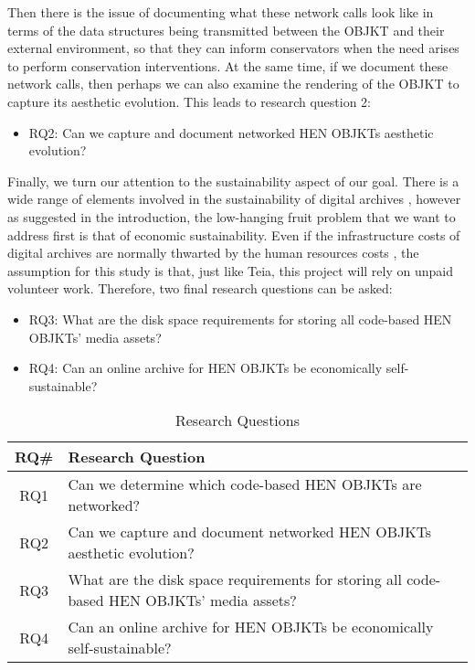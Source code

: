 Then there is the issue of documenting what these network calls look like in terms of the data structures being transmitted between the OBJKT and their external environment, so that they can inform conservators when the need arises to perform conservation interventions. At the same time, if we document these network calls, then perhaps we can also examine the rendering of the OBJKT to capture its aesthetic evolution. This leads to research question 2:

\begin{itemize}
	\item RQ2: Can we capture and document networked HEN OBJKTs aesthetic evolution?
\end{itemize}

Finally, we turn our attention to the sustainability aspect of our goal. There is a wide range of elements involved in the sustainability of digital archives \cite{visDigitalArchivingSustainable2024}, however as suggested in the introduction, the low-hanging fruit problem that we want to address first is that of economic sustainability. Even if the infrastructure costs of digital archives are normally thwarted by the human resources costs \cite{CostsDigitalRepositories}, the assumption for this study is that, just like Teia, this project will rely on unpaid volunteer work. Therefore, two final research questions can be asked: 

\begin{itemize}
	\item RQ3: What are the disk space requirements for storing all code-based HEN OBJKTs' media assets?
	\item RQ4: Can an online archive for HEN OBJKTs be economically self-sustainable?
\end{itemize}

\vspace{0.5cm}

\begin{table}[h!]
\centering
\footnotesize
\begin{tabular}{|c|p{10cm}|}
\hline
\textbf{RQ\#} & \textbf{Research Question} \\ \hline
RQ1 & Can we determine which code-based HEN OBJKTs are networked? \\ \hline
RQ2 & Can we capture and document networked HEN OBJKTs aesthetic evolution? \\ \hline
RQ3 & What are the disk space requirements for storing all code-based HEN OBJKTs' media assets? \\ \hline
RQ4 & Can an online archive for HEN OBJKTs be economically self-sustainable? \\ \hline
\end{tabular}
\caption{Research Questions}
\end{table}


